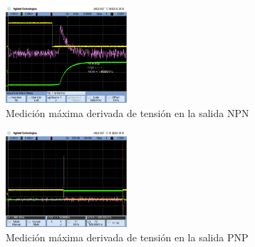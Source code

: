 \begin{multicols}{2}
\begin{figure}[H]
  \centering
    \includegraphics[width=0.4\textwidth]{ejercicio1/maxI-NPN}
    \caption{Medición máxima derivada de tensión en la salida NPN} %
\end{figure}

\begin{figure}[H]
  \centering
    \includegraphics[width=0.4\textwidth]{ejercicio1/maxI-PNP}
    \caption{Medición máxima derivada de tensión en la salida PNP} %
\end{figure}
\end{multicols}
